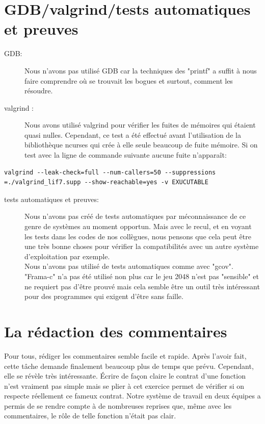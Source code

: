 \documentclass{report}
\begin{document}
\section{GDB/valgrind/tests automatiques et preuves}
\begin{description}
\item[GDB:]
Nous n'avons pas utilisé GDB car la techniques des "printf" a suffit à nous faire comprendre où se trouvait les bogues et surtout, comment les résoudre.
\item[valgrind :]
Nous avons utilisé valgrind pour vérifier les fuites de mémoires qui étaient quasi nulles. Cependant, ce test a été effectué avant l'utilisation de la bibliothèque ncurses qui crée à elle seule beaucoup de fuite mémoire. Si on test avec la ligne de commande suivante aucune fuite n'apparaît:
\end{description}
\begin{lstlisting}[frame=single]
valgrind --leak-check=full --num-callers=50 --suppressions
=./valgrind_lif7.supp --show-reachable=yes -v EXUCUTABLE
\end{lstlisting}
\begin{description}
\item[tests automatiques et preuves:]
Nous n'avons pas créé de tests automatiques par méconnaissance de ce genre de systèmes au moment opportun. Mais avec le recul, et en voyant les tests dans les codes de nos collègues, nous pensons que cela peut être une très bonne choses pour vérifier la compatibilités avec un autre système d'exploitation par exemple.\\
Nous n'avons pas utilisé de tests automatiques comme avec "gcov". \\"Frama-c" n'a pas été utilisé non plus car le jeu 2048 n'est pas "sensible" et ne requiert pas d'être prouvé mais cela semble être un outil très intéressant pour des programmes qui exigent d'être sans faille.
\end{description}
\section{La rédaction des commentaires}
Pour tous, rédiger les commentaires semble facile et rapide. Après l'avoir fait, cette tâche demande finalement beaucoup plus de temps que prévu. Cependant, elle se révèle très intéressante. Écrire de façon claire le contrat d'une fonction n'est vraiment pas simple mais se plier à cet exercice permet de vérifier si on respecte réellement ce fameux contrat. Notre système de travail en deux équipes a permis de se rendre compte à de nombreuses reprises que, même avec les commentaires, le rôle de telle fonction n'était pas clair.
\end{document}
